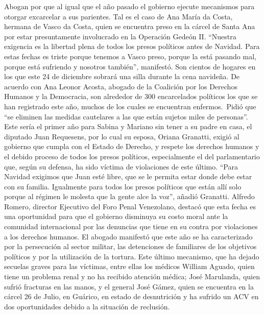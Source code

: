 \documentclass{article}%
\begin{document}
\newline%
%
Abogan por que al igual que el año pasado el gobierno ejecute mecanismos para otorgar excarcelar a sus parientes. Tal es el caso de Ana María da Costa, hermana de Vasco da Costa, quien se encuentra preso en la cárcel de Santa Ana por estar presuntamente involucrado en la Operación Gedeón II.%
\newline%
%
“Nuestra exigencia es la libertad plena de todos los presos políticos antes de Navidad. Para estas fechas es triste porque tenemos a Vasco preso, porque la está pasando mal, porque está sufriendo y nosotros también”, manifestó.%
\newline%
%
Son cientos de hogares en los que este 24 de diciembre sobrará una silla durante la cena navideña. De acuerdo con Ana Leonor Acosta, abogado de la Coalición por los Derechos Humanos y la Democracia, son alrededor de 300 encarcelados políticos los que se han registrado este año, muchos de los cuales se encuentran enfermos.~Pidió que “se eliminen las medidas cautelares a las que están sujetos miles de personas”.%
\newline%
%
Este sería el primer año para Sabina y Mariano sin tener a su padre en casa, el diputado Juan Requesens, por lo cual su esposa, Oriana Granatti, exigió al gobierno que cumpla con el Estado de Derecho, y respete los derechos humanos y el debido proceso de todos los presos políticos, especialmente el del parlamentario que, según su defensa, ha sido víctima de violaciones de este último.%
\newline%
%
“Para Navidad exigimos que Juan esté libre, que se le permita estar donde debe estar con su familia. Igualmente para todos los presos políticos que están allí solo porque al régimen le molesta que la gente alce la voz”, añadió Granatti.%
\newline%
%
Alfredo Romero, director Ejecutivo del Foro Penal Venezolano, destacó que esta fecha es una oportunidad para que el gobierno disminuya su costo moral ante la comunidad internacional por las denuncias que tiene en su contra por violaciones a los derechos humanos.%
\newline%
%
El abogado manifestó que este año se ha caracterizado por la persecución al sector militar, las detenciones de familiares de los objetivos políticos y por la utilización de la tortura. Este último mecanismo, que ha dejado secuelas graves para las víctimas, entre ellas los médicos William Aguado, quien tiene un problema renal y no ha recibido atención médica; José Marulanda, quien sufrió fracturas en las manos, y el general José Gámez, quien se encuentra en la cárcel 26 de Julio, en Guárico, en estado de desnutrición y ha sufrido un ACV en dos oportunidades debido a la situación de reclusión.%
\end{document}
